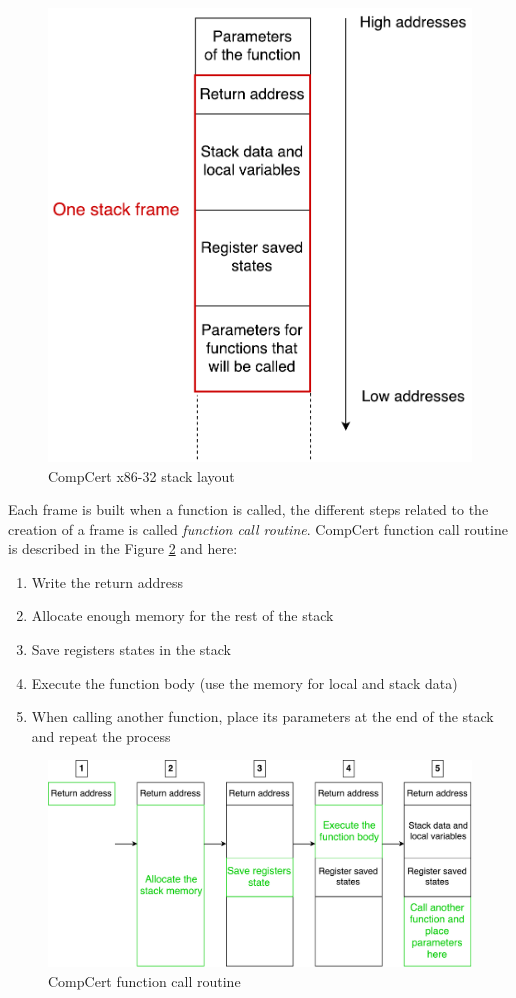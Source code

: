 \documentclass[11pt]{sdm}
\begin{document}
\begin{figure}
\centering
\includegraphics[scale=0.5]{images/stack_layout.pdf}
\caption{CompCert x86-32 stack layout}
\label{stack_layout}
\end{figure}

Each frame is built when a function is called, the different steps related to the creation of a frame is called \textit{function call routine}.
CompCert function call routine is described in the Figure \ref{call_routine} and here:
\begin{enumerate}
	\item Write the return address
	\item Allocate enough memory for the rest of the stack
	\item Save registers states in the stack
	\item Execute the function body (use the memory for local and stack data)
	\item When calling another function, place its parameters at the end of the stack and repeat the process
\end{enumerate}

\begin{figure}
\centering
\includegraphics[scale=0.5]{images/call_routine.pdf}
\caption{CompCert function call routine}
\label{call_routine}
\end{figure}
\end{document}
